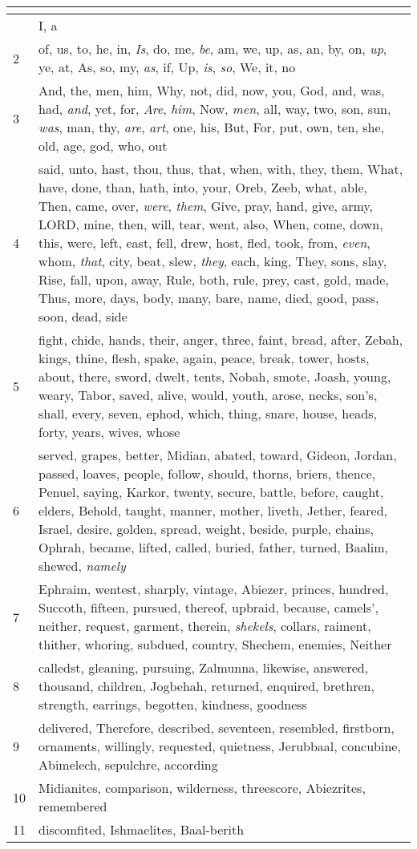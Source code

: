 \begin{center}
\begin{longtable}{l|p{3.75in}}
\hline \multicolumn{2}{c}{{ }} \\ \hline
\endfoot 
1 & I, a\\ \hline 
2 & of, us, to, he, in, \emph{Is}, do, me, \emph{be}, am, we, up, as, an, by, on, \emph{up}, ye, at, As, so, my, \emph{as}, if, Up, \emph{is}, \emph{so}, We, it, no\\ \hline 
3 & And, the, men, him, Why, not, did, now, you, God, and, was, had, \emph{and}, yet, for, \emph{Are}, \emph{him}, Now, \emph{men}, all, way, two, son, sun, \emph{was}, man, thy, \emph{are}, \emph{art}, one, his, But, For, put, own, ten, she, old, age, god, who, out\\ \hline 
4 & said, unto, hast, thou, thus, that, when, with, they, them, What, have, done, than, hath, into, your, Oreb, Zeeb, what, able, Then, came, over, \emph{were}, \emph{them}, Give, pray, hand, give, army, LORD, mine, then, will, tear, went, also, When, come, down, this, were, left, east, fell, drew, host, fled, took, from, \emph{even}, whom, \emph{that}, city, beat, slew, \emph{they}, each, king, They, sons, slay, Rise, fall, upon, away, Rule, both, rule, prey, cast, gold, made, Thus, more, days, body, many, bare, name, died, good, pass, soon, dead, side\\ \hline 
5 & fight, chide, hands, their, anger, three, faint, bread, after, Zebah, kings, thine, flesh, spake, again, peace, break, tower, hosts, about, there, sword, dwelt, tents, Nobah, smote, Joash, young, weary, Tabor, saved, alive, would, youth, arose, necks, son's, shall, every, seven, ephod, which, thing, snare, house, heads, forty, years, wives, whose\\ \hline 
6 & served, grapes, better, Midian, abated, toward, Gideon, Jordan, passed, loaves, people, follow, should, thorns, briers, thence, Penuel, saying, Karkor, twenty, secure, battle, before, caught, elders, Behold, taught, manner, mother, liveth, Jether, feared, Israel, desire, golden, spread, weight, beside, purple, chains, Ophrah, became, lifted, called, buried, father, turned, Baalim, shewed, \emph{namely}\\ \hline 
7 & Ephraim, wentest, sharply, vintage, Abiezer, princes, hundred, Succoth, fifteen, pursued, thereof, upbraid, because, camels', neither, request, garment, therein, \emph{shekels}, collars, raiment, thither, whoring, subdued, country, Shechem, enemies, Neither\\ \hline 
8 & calledst, gleaning, pursuing, Zalmunna, likewise, answered, thousand, children, Jogbehah, returned, enquired, brethren, strength, earrings, begotten, kindness, goodness\\ \hline 
9 & delivered, Therefore, described, seventeen, resembled, firstborn, ornaments, willingly, requested, quietness, Jerubbaal, concubine, Abimelech, sepulchre, according\\ \hline 
10 & Midianites, comparison, wilderness, threescore, Abiezrites, remembered\\ \hline 
11 & discomfited, Ishmaelites, Baal-berith\\ \hline 
\end{longtable}
\end{center}





